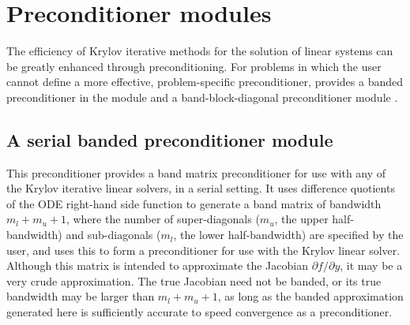 \section{Preconditioner modules}\label{ss:preconds}

The efficiency of Krylov iterative methods for the solution of linear systems 
can be greatly enhanced through preconditioning. For problems in which the 
user cannot define a more effective, problem-specific preconditioner,
{\cvodes} provides a banded preconditioner in the module {\cvbandpre} and
a band-block-diagonal preconditioner module {\cvbbdpre}.

\subsection{A serial banded preconditioner module}\label{sss:cvbandpre}


This preconditioner provides a band matrix preconditioner for use with
any of the Krylov iterative linear solvers, in a serial setting.
It uses difference quotients of the ODE right-hand side function  to
generate a band matrix of bandwidth $m_l + m_u + 1$, where the number of
super-diagonals ($m_u$, the upper half-bandwidth) and sub-diagonals
($m_l$, the lower half-bandwidth) are specified by the user, and uses this to
form a preconditioner for use with the Krylov linear solver.
Although this matrix is intended to approximate the Jacobian
$\partial f / \partial y$, it may be a very crude approximation.  The true Jacobian
need not be banded, or its true bandwidth may be larger than $m_l + m_u + 1$, as
long as the banded approximation generated here is sufficiently accurate to
speed convergence as a preconditioner. 

